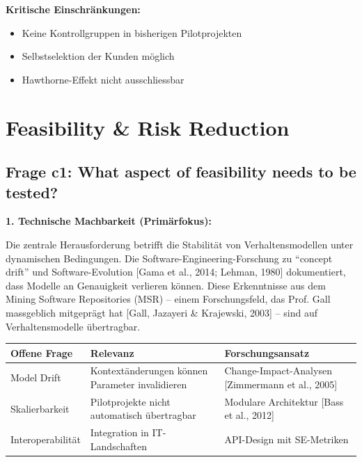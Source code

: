 \documentclass[11pt,a4paper]{article}
\newcommand{\evidence}[1]{\textcolor{fehrgray}{[#1]}}
\begin{document}
\textbf{Kritische Einschränkungen:}
\begin{itemize}[leftmargin=2em]
    \item Keine Kontrollgruppen in bisherigen Pilotprojekten
    \item Selbstselektion der Kunden möglich
    \item Hawthorne-Effekt nicht ausschliessbar
\end{itemize}

\newpage
\section{Feasibility \& Risk Reduction}

\subsection{Frage c1: What aspect of feasibility needs to be tested?}

\textbf{1. Technische Machbarkeit (Primärfokus):}

Die zentrale Herausforderung betrifft die Stabilität von Verhaltensmodellen unter dynamischen Bedingungen. Die Software-Engineering-Forschung zu ``concept drift'' und Software-Evolution \evidence{Gama et al., 2014; Lehman, 1980} dokumentiert, dass Modelle an Genauigkeit verlieren können. Diese Erkenntnisse aus dem Mining Software Repositories (MSR) -- einem Forschungsfeld, das Prof. Gall massgeblich mitgeprägt hat \evidence{Gall, Jazayeri \& Krajewski, 2003} -- sind auf Verhaltensmodelle übertragbar.

\begin{table}[h]
\centering
\begin{tabular}{@{}L{3.5cm}L{5cm}L{5cm}@{}}
\toprule
\textbf{Offene Frage} & \textbf{Relevanz} & \textbf{Forschungsansatz} \\
\midrule
Model Drift & Kontextänderungen können Parameter invalidieren & Change-Impact-Analysen \evidence{Zimmermann et al., 2005} \\
Skalierbarkeit & Pilotprojekte nicht automatisch übertragbar & Modulare Architektur \evidence{Bass et al., 2012} \\
Interoperabilität & Integration in IT-Landschaften & API-Design mit SE-Metriken \\
\bottomrule
\end{tabular}
\end{table}
\end{document}
